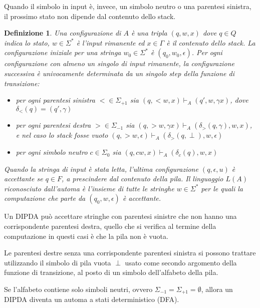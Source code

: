 \documentclass[a4paper,12pt]{report}
\newtheorem{definition}{Definizione}[chapter]
\theoremstyle{propositionstyle}
\begin{document}
    Quando il simbolo in input è, invece, un simbolo neutro o una parentesi sinistra, il prossimo stato non dipende dal contenuto dello stack.

    \begin{definition}
        \label{def:configuration}
        Una configurazione di $A$ è una tripla $\left(q, w, x\right)$ dove $q \in Q$ indica lo stato, $w \in \Sigma^*$ è l'input rimanente ed  $x \in \Gamma$ è il contenuto dello stack.
        La configurazione iniziale per una stringa $w_0 \in \Sigma^*$ è $\left(q_0, w_0, \epsilon\right)$.
        Per ogni configurazione con almeno un singolo di input rimanente, la configurazione successiva è univocamente determinata da un singolo step della funzione di transizione:
        \begin{itemize}
            \item per ogni parentesi sinistra $< \in \Sigma_{+1}$ sia $(q, <w, x) \vdash_{A} (q', w, \gamma x)$, dove $\delta_{<}(q) = (q', \gamma)$
            \item per ogni parentesi destra $> \in \Sigma_{-1}$ sia $(q, >w, \gamma x) \vdash_{A} (\delta_{>}(q, \gamma), w, x)$, e nel caso lo stack fosse vuoto $(q, >w, \epsilon) \vdash_{A} (\delta_{>}(q, \perp), w, \epsilon)$
            \item per ogni simbolo neutro $c \in \Sigma_{0}$ sia $(q, cw, x) \vdash_{A} (\delta_{c}(q), w, x)$
        \end{itemize}

        Quando la stringa di input è stata letta, l'ultima configurazione $\left(q, \epsilon, u\right)$ è accettante se $q \in F$, a prescindere dal contenuto della pila.
        Il linguaggio $L\left(A\right)$ riconosciuto dall'automa è l'insieme di tutte le stringhe $w \in \Sigma^*$ per le quali la computazione che parte da $\left(q_0, w, \epsilon\right)$ è accettante.
    \end{definition}

    Un DIPDA può accettare stringhe con parentesi sinistre che non hanno una corrispondente parentesi destra, quello che si verifica al termine della computazione in questi casi è che la pila non è vuota.

    Le parentesi destre senza una corrispondente parentesi sinistra si possono trattare utilizzando il simbolo di pila vuota $\perp$ usato come secondo argomento della funzione di transizione, al posto di un simbolo dell'alfabeto della pila.

    Se l'alfabeto contiene solo simboli neutri, ovvero $\Sigma_{-1} = \Sigma_{+1} = \emptyset$, allora un DIPDA diventa un automa a stati deterministico (DFA).
\end{document}
